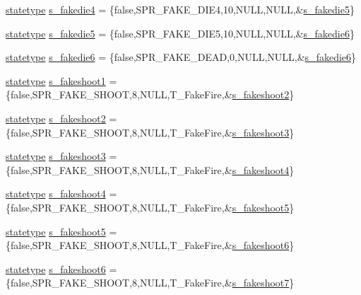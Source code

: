 \begin{DoxyCompactItemize}
\item 
\hyperlink{structstatestruct}{statetype} \hyperlink{WL__ACT2_8C_ac4afbd385f447724aeadd9b14a3277aa}{s\_\-fakedie4} = \{false,SPR\_\-FAKE\_\-DIE4,10,NULL,NULL,\&\hyperlink{WL__ACT2_8C_ab4f024cc5e316fbd9fbf59e48e22353a}{s\_\-fakedie5}\}
\item 
\hyperlink{structstatestruct}{statetype} \hyperlink{WL__ACT2_8C_ab4f024cc5e316fbd9fbf59e48e22353a}{s\_\-fakedie5} = \{false,SPR\_\-FAKE\_\-DIE5,10,NULL,NULL,\&\hyperlink{WL__ACT2_8C_a7238b6642ffa8a01492f6ff84a36e4ef}{s\_\-fakedie6}\}
\item 
\hyperlink{structstatestruct}{statetype} \hyperlink{WL__ACT2_8C_a7238b6642ffa8a01492f6ff84a36e4ef}{s\_\-fakedie6} = \{false,SPR\_\-FAKE\_\-DEAD,0,NULL,NULL,\&\hyperlink{WL__ACT2_8C_a7238b6642ffa8a01492f6ff84a36e4ef}{s\_\-fakedie6}\}
\item 
\hyperlink{structstatestruct}{statetype} \hyperlink{WL__ACT2_8C_a3a311aefad46f6143d5cd436be79fc0f}{s\_\-fakeshoot1} = \{false,SPR\_\-FAKE\_\-SHOOT,8,NULL,T\_\-FakeFire,\&\hyperlink{WL__ACT2_8C_ae09d40e3d3f28f4c95b02e8705cc48d8}{s\_\-fakeshoot2}\}
\item 
\hyperlink{structstatestruct}{statetype} \hyperlink{WL__ACT2_8C_ae09d40e3d3f28f4c95b02e8705cc48d8}{s\_\-fakeshoot2} = \{false,SPR\_\-FAKE\_\-SHOOT,8,NULL,T\_\-FakeFire,\&\hyperlink{WL__ACT2_8C_a29da19b83e69f1d3a51f8639f6358f0f}{s\_\-fakeshoot3}\}
\item 
\hyperlink{structstatestruct}{statetype} \hyperlink{WL__ACT2_8C_a29da19b83e69f1d3a51f8639f6358f0f}{s\_\-fakeshoot3} = \{false,SPR\_\-FAKE\_\-SHOOT,8,NULL,T\_\-FakeFire,\&\hyperlink{WL__ACT2_8C_a09c226f20369d67aebdcd7c41579a034}{s\_\-fakeshoot4}\}
\item 
\hyperlink{structstatestruct}{statetype} \hyperlink{WL__ACT2_8C_a09c226f20369d67aebdcd7c41579a034}{s\_\-fakeshoot4} = \{false,SPR\_\-FAKE\_\-SHOOT,8,NULL,T\_\-FakeFire,\&\hyperlink{WL__ACT2_8C_a3de1e1749978980bb4847b7fb2cba735}{s\_\-fakeshoot5}\}
\item 
\hyperlink{structstatestruct}{statetype} \hyperlink{WL__ACT2_8C_a3de1e1749978980bb4847b7fb2cba735}{s\_\-fakeshoot5} = \{false,SPR\_\-FAKE\_\-SHOOT,8,NULL,T\_\-FakeFire,\&\hyperlink{WL__ACT2_8C_aa5e6e46c4cc5c70646530b05d8d8f0f9}{s\_\-fakeshoot6}\}
\item 
\hyperlink{structstatestruct}{statetype} \hyperlink{WL__ACT2_8C_aa5e6e46c4cc5c70646530b05d8d8f0f9}{s\_\-fakeshoot6} = \{false,SPR\_\-FAKE\_\-SHOOT,8,NULL,T\_\-FakeFire,\&\hyperlink{WL__ACT2_8C_a7a10174c868f49b0c325e88f823b82e7}{s\_\-fakeshoot7}\}

\end{DoxyCompactItemize}
